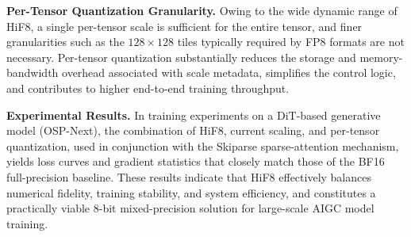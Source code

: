 \noindent\textbf{Per-Tensor Quantization Granularity.}
Owing to the wide dynamic range of HiF8, a single per-tensor scale is sufficient
for the entire tensor, and finer granularities such as the $128\!\times\!128$ tiles
typically required by FP8 formats are not necessary.
Per-tensor quantization substantially reduces the storage and memory-bandwidth
overhead associated with scale metadata, simplifies the control logic, and
contributes to higher end-to-end training throughput.

\noindent\textbf{Experimental Results.}
In training experiments on a DiT-based generative model (OSP-Next), the combination
of HiF8, current scaling, and per-tensor quantization, used in conjunction with the
Skiparse sparse-attention mechanism, yields loss curves and gradient statistics that
closely match those of the BF16 full-precision baseline.
These results indicate that HiF8 effectively balances numerical fidelity, training
stability, and system efficiency, and constitutes a practically viable 8-bit
mixed-precision solution for large-scale AIGC model training.
